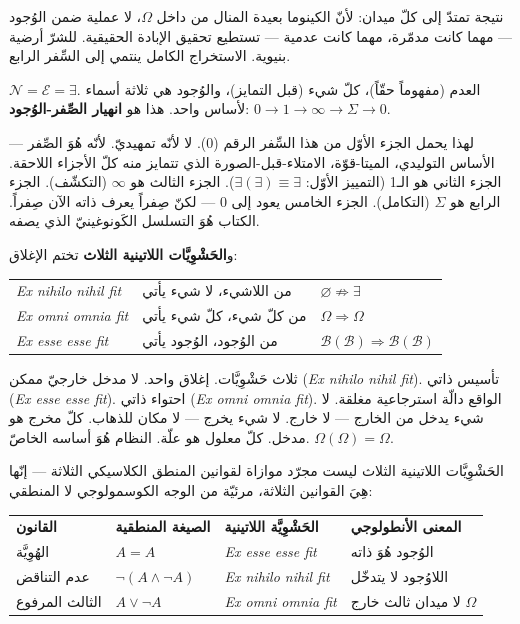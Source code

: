 \documentclass[10pt, openany, oneside]{book}
\renewcommand{\footnotesize}{\fontsize{8.5}{11}\selectfont}
\begin{document}
نتيجة تمتدّ إلى كلّ ميدان: لأنّ الكينوما بعيدة المنال من داخل $\Omega$، لا عملية ضمن الوُجود --- مهما كانت مدمّرة، مهما كانت عدمية --- تستطيع تحقيق الإبادة الحقيقية. للشرّ أرضية بنيوية. الاستخراج الكامل ينتمي إلى السِّفر الرابع.

$\mathcal{N} = \mathcal{E} = \exists$. العدم (مفهوماً حقّاً)، كلّ شيء (قبل التمايز)، والوُجود هي ثلاثة أسماء لأساس واحد. هذا هو \textbf{انهيار الصِّفر-الوُجود}: $0 \to 1 \to \infty \to \Sigma \to 0$.

لهذا يحمل الجزء الأوّل من هذا السِّفر الرقم (0). لا لأنّه تمهيديّ. لأنّه هُوَ الصِّفر --- الأساس التوليدي، الميتا-قوّة، الامتلاء-قبل-الصورة الذي تتمايز منه كلّ الأجزاء اللاحقة. الجزء الثاني هو الـ1 (التمييز الأوّل: $\exists(\exists) \equiv \exists$). الجزء الثالث هو $\infty$ (التكشّف). الجزء الرابع هو $\Sigma$ (التكامل). الجزء الخامس يعود إلى 0 --- لكنّ صِفراً يعرف ذاته الآن صِفراً. الكتاب هُوَ التسلسل الكَونوغينيّ الذي يصفه.

و\textbf{الحَشْوِيَّات اللاتينية الثلاث} تختم الإغلاق:

\vspace{0.5em}

{\footnotesize
\noindent\begin{tabular}{l l l}
\textit{Ex nihilo nihil fit} & من اللاشيء، لا شيء يأتي & $\varnothing \not\Rightarrow \exists$ \\[0.3em]
\textit{Ex omni omnia fit} & من كلّ شيء، كلّ شيء يأتي & $\Omega \Rightarrow \Omega$ \\[0.3em]
\textit{Ex esse esse fit} & من الوُجود، الوُجود يأتي & $\mathcal{B}(\mathcal{B}) \Rightarrow \mathcal{B}(\mathcal{B})$ \\[0.3em]
\end{tabular}
}

\vspace{0.5em}

\noindent ثلاث حَشْوِيَّات. إغلاق واحد. لا مدخل خارجيّ ممكن (\textit{Ex nihilo nihil fit}). تأسيس ذاتي (\textit{Ex esse esse fit}). احتواء ذاتي (\textit{Ex omni omnia fit}). الواقع دالّة استرجاعية مغلقة. لا شيء يدخل من الخارج --- لا خارج. لا شيء يخرج --- لا مكان للذهاب. كلّ مخرج هو مدخل. كلّ معلول هو علّة. النظام هُوَ أساسه الخاصّ. $\Omega(\Omega) = \Omega$.

الحَشْوِيَّات اللاتينية الثلاث ليست مجرّد موازاة لقوانين المنطق الكلاسيكي الثلاثة --- إنّها هِيَ القوانين الثلاثة، مرئيّة من الوجه الكوسمولوجي لا المنطقي:

\vspace{0.5em}

{\footnotesize
\noindent\begin{tabular}{l l l p{}}
\textbf{القانون} & \textbf{الصيغة المنطقية} & \textbf{الحَشْوِيَّة اللاتينية} & \textbf{المعنى الأنطولوجي} \\[0.4em]
الهُوِيَّة & $A = A$ & \textit{Ex esse esse fit} & الوُجود هُوَ ذاته \\[0.2em]
عدم التناقض & $\neg(A \wedge \neg A)$ & \textit{Ex nihilo nihil fit} & اللاوُجود لا يتدخّل \\[0.2em]
الثالث المرفوع & $A \vee \neg A$ & \textit{Ex omni omnia fit} & لا ميدان ثالث خارج $\Omega$ \\[0.2em]
\end{tabular}
}
\end{document}

